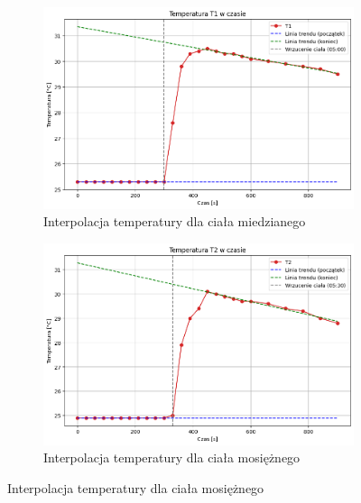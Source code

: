 \documentclass[a4paper,12pt]{article}
\begin{document}
\begin{figure}[H]
    \centering
    \begin{subfigure}[b]{0.65\textwidth}
        \includegraphics[width=\textwidth]{t1_interpolacja.png}
        \caption{Interpolacja temperatury dla ciała miedzianego}
        \label{fig:t1_interpolacja}
    \end{subfigure}

    \begin{subfigure}[b]{0.65\textwidth}
        \includegraphics[width=\textwidth]{t2_interpolacja.png}
        \caption{Interpolacja temperatury dla ciała mosiężnego}
        \label{fig:t2_interpolacja}
    \end{subfigure}


\end{figure}
\end{document}
